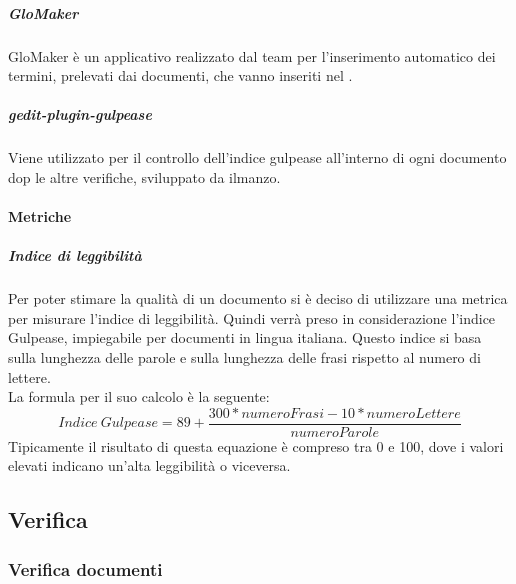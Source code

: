 \documentclass[../NormeDiProgetto_v3.0.0.tex]{subfiles}
\begin{document}
				\subparagraph{GloMaker}
				GloMaker è un applicativo realizzato dal team per l'inserimento automatico dei termini, prelevati dai documenti, che vanno inseriti nel \glossario.
			
				\subparagraph{gedit-plugin-gulpease}
				Viene utilizzato per il controllo dell'indice gulpease all'interno di ogni documento dop le altre verifiche, sviluppato da ilmanzo.
				

			\paragraph{Metriche}
				\subparagraph{Indice di leggibilità}
				Per poter stimare la qualità di un documento si è deciso di utilizzare una metrica per misurare l'indice di leggibilità. Quindi verrà preso in considerazione l'indice Gulpease, impiegabile per documenti in lingua italiana. Questo indice si basa sulla lunghezza delle parole e sulla lunghezza delle frasi rispetto al numero di lettere.\\
				La formula per il suo calcolo è la seguente:
				\begin{equation*}
					Indice \ Gulpease = 89 + \frac{300*numeroFrasi - 10*numeroLettere}{numeroParole}
				\end{equation*}
				Tipicamente il risultato di questa equazione è compreso tra 0 e 100, dove i valori elevati indicano un'alta leggibilità o viceversa.\\



	\subsection{Verifica}

		\subsubsection{Verifica documenti}
\end{document}

